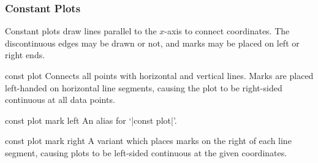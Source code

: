 {\subsubsection{Constant Plots}
Constant plots draw lines parallel to the $x$-axis to connect coordinates. The discontinuous edges may be drawn or not, and marks may be placed on left or right ends.

\begin{plottype}{const plot}
Connects all points with horizontal and vertical lines. Marks are placed left-handed on horizontal line segments, causing the plot to be right-sided continuous at all data points.

\begin{codeexample}[]
\end{codeexample}


\begin{codeexample}[]
\end{codeexample}
\end{plottype}

\begin{plottype}{const plot mark left}
An alias for `|const plot|'.
\end{plottype}

\begin{plottype}{const plot mark right}
 A variant which places marks on the right of each line segment, causing plots to be left-sided continuous at the given coordinates.
\begin{codeexample}[]
\end{codeexample}
\end{plottype}

}
